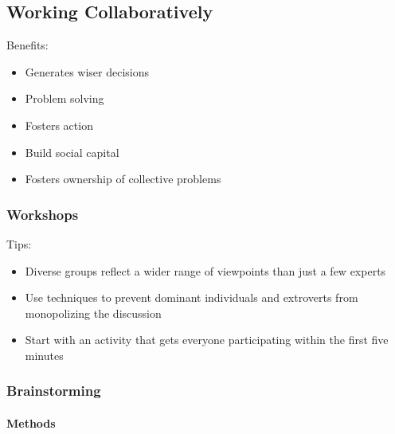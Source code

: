 \documentclass[letterpaper,10pt,english]{jupyterBook}
\begin{document}
\subsection{Working Collaboratively}
\label{\detokenize{APM/agile:working-collaboratively}}
\sphinxAtStartPar
Benefits:
\begin{itemize}
\item {} 
\sphinxAtStartPar
Generates wiser decisions

\item {} 
\sphinxAtStartPar
Problem solving

\item {} 
\sphinxAtStartPar
Fosters action

\item {} 
\sphinxAtStartPar
Build social capital

\item {} 
\sphinxAtStartPar
Fosters ownership of collective problems

\end{itemize}


\subsubsection{Workshops}
\label{\detokenize{APM/agile:workshops}}
\sphinxAtStartPar
Tips:
\begin{itemize}
\item {} 
\sphinxAtStartPar
Diverse groups reflect a wider range of viewpoints than just a few experts

\item {} 
\sphinxAtStartPar
Use techniques to prevent dominant individuals and extroverts from monopolizing the discussion

\item {} 
\sphinxAtStartPar
Start with an activity that gets everyone participating within the first five minutes

\end{itemize}


\subsubsection{Brainstorming}
\label{\detokenize{APM/agile:brainstorming}}

\paragraph{Methods}
\label{\detokenize{APM/agile:methods}}
\end{document}

